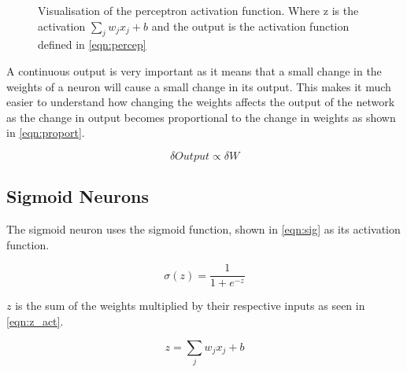 \begin{figure}
\begin{center}
\caption{Visualisation of the perceptron activation function. Where z is the activation $\sum_{j} w_j x_j + b$ and the output is the activation function defined in \autoref{eqn:percep} }
\label{fig:activation_percep}
\end{center}
\end{figure}

A continuous output is very important as it means that a small change in the weights of a neuron will cause a small change in its output. This makes it much easier to understand how changing the weights affects the output of the network as the change in output becomes proportional to the change in weights as shown in \autoref{eqn:proport}.

\begin{equation} \label{eqn:proport}
	\delta Output \propto \delta W	
\end{equation}  


\subsection{Sigmoid Neurons}

The sigmoid neuron uses the sigmoid function, shown in \autoref{eqn:sig} as its activation function. 

\begin{equation} \label{eqn:sig}
\sigma(z) = \frac{1}{1 + e^{-z}}
\end{equation}

$z$ is the sum of the weights multiplied by their respective inputs as seen in  \autoref{eqn:z_act}.

\begin{equation} \label{eqn:z_act}
z = \sum_{j} w_j x_j + b
\end{equation}

